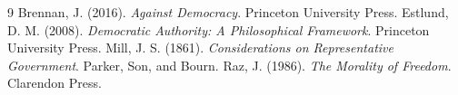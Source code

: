 \documentclass{situationist-preprint}
\begin{document}
\begin{thebibliography}{9}\small
{} Brennan, J. (2016). \emph{Against Democracy}. Princeton University Press.
 Estlund, D. M. (2008). \emph{Democratic Authority: A Philosophical Framework}. Princeton University Press.
 Mill, J. S. (1861). \emph{Considerations on Representative Government}. Parker, Son, and Bourn.
 Raz, J. (1986). \emph{The Morality of Freedom}. Clarendon Press.
\end{thebibliography}
\end{document}
